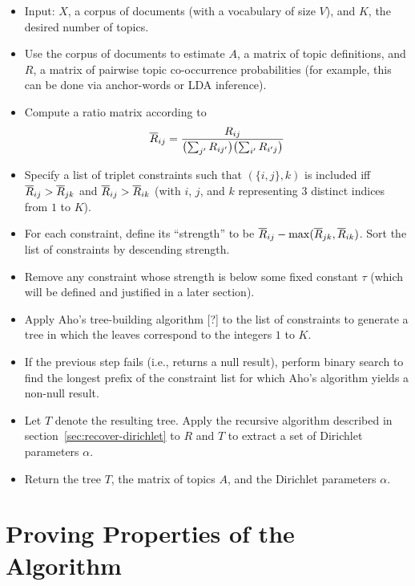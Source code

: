\documentclass{article}
\theoremstyle{definition}
\newcommand{\tocite}{[?]}
\begin{document}
\begin{itemize}
  \item Input: $X$, a corpus of documents (with a vocabulary of size $V$), and $K$, the desired number of topics.
  \item Use the corpus of documents to estimate $A$, a matrix of topic definitions, and $R$, a matrix of pairwise topic co-occurrence probabilities (for example, this can be done via anchor-words or LDA inference).
  \item Compute a ratio matrix according to
  \begin{align}
  \overline{R}_{ij} = \frac{R_{ij}}{ \bigl( \sum_{j'} R_{ij'} \bigr) \bigl( \sum_{i'} R_{i'j} \bigr) }
  \label{eqn:ratioFromCooccur}
  \end{align}
  \item Specify a list of triplet constraints such that $(\{i, j\}, k)$ is included iff $\overline{R}_{ij} > \overline{R}_{jk}$ and $\overline{R}_{ij} > \overline{R}_{ik}$ (with $i$, $j$, and $k$ representing 3 distinct indices from $1$ to $K$).
  \item For each constraint, define its ``strength'' to be $\overline{R}_{ij} - \max(\overline{R}_{jk}, \overline{R}_{ik})$.
        Sort the list of constraints by descending strength.
  \item Remove any constraint whose strength is below some fixed constant $\tau$ (which will be defined and justified in a later section).
  \item Apply Aho's tree-building algorithm \tocite{} to the list of constraints to generate a tree in which the leaves correspond to the integers $1$ to $K$.
  \item If the previous step fails (i.e., returns a null result), perform binary search to find the longest prefix of the constraint list for which Aho's algorithm yields a non-null result.
  \item Let $T$ denote the resulting tree.
  Apply the recursive algorithm described in section~\ref{sec:recover-dirichlet} to $R$ and $T$ to extract a set of Dirichlet parameters $\alpha$.
  \item Return the tree $T$, the matrix of topics $A$, and the Dirichlet parameters $\alpha$.
\end{itemize}


\section{Proving Properties of the Algorithm}
\end{document}
